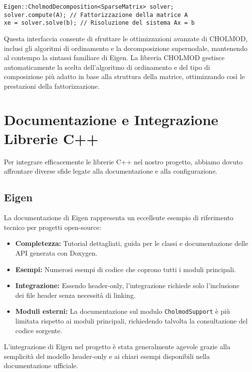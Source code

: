 \begin{verbatim}
Eigen::CholmodDecomposition<SparseMatrix> solver;
solver.compute(A); // Fattorizzazione della matrice A
xe = solver.solve(b); // Risoluzione del sistema Ax = b
\end{verbatim}

Questa interfaccia consente di sfruttare le ottimizzazioni avanzate di CHOLMOD, inclusi gli algoritmi di ordinamento e 
la decomposizione supernodale, mantenendo al contempo la sintassi familiare di Eigen. La libreria CHOLMOD gestisce 
automaticamente la scelta dell'algoritmo di ordinamento e del tipo di composizione più adatto in base alla struttura della matrice, 
ottimizzando così le prestazioni della fattorizzazione.

\section{Documentazione e Integrazione Librerie C++}

Per integrare efficacemente le librerie C++ nel nostro progetto, abbiamo dovuto affrontare diverse sfide legate alla documentazione e
alla configurazione.

\subsection{Eigen}

La documentazione di Eigen rappresenta un eccellente esempio di riferimento tecnico per progetti open-source:

\begin{itemize}
    \item \textbf{Completezza:} Tutorial dettagliati, guida per le classi e documentazione delle API generata con Doxygen.
    \item \textbf{Esempi:} Numerosi esempi di codice che coprono tutti i moduli principali.
    \item \textbf{Integrazione:} Essendo header-only, l'integrazione richiede solo l'inclusione dei file header senza necessità di linking.
    \item \textbf{Moduli esterni:} La documentazione sul modulo \texttt{CholmodSupport} è più limitata rispetto ai moduli 
    principali, richiedendo talvolta la consultazione del codice sorgente.
\end{itemize}

L'integrazione di Eigen nel progetto è stata generalmente agevole grazie alla semplicità del modello header-only e ai chiari esempi 
disponibili nella documentazione ufficiale.

